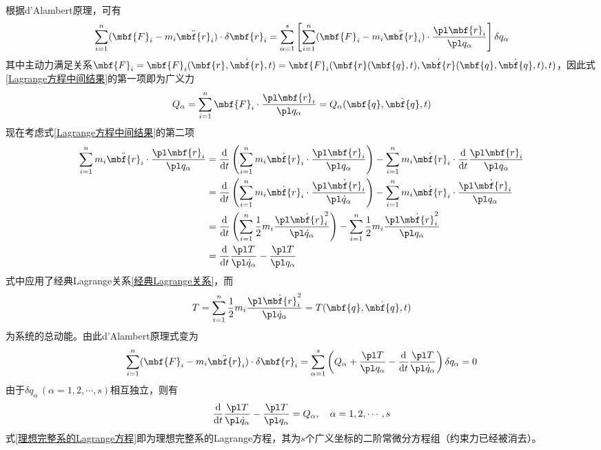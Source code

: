 根据d'Alambert原理，可有
\begin{equation}
	\sum_{i=1}^n (\mbf{F}_i - m_i \ddot{\mbf{r}}_i) \cdot \delta \mbf{r}_i = \sum_{\alpha=1}^s \left[\sum_{i=1}^n (\mbf{F}_i - m_i \ddot{\mbf{r}}_i) \cdot \frac{\pl \mbf{r}_i}{\pl q_\alpha}\right] \delta q_\alpha
	\label{Lagrange方程中间结果}
\end{equation}
其中主动力满足关系$\mbf{F}_i = \mbf{F}_i(\mbf{r},\dot{\mbf{r}},t) = \mbf{F}_i(\mbf{r}(\mbf{q},t),\dot{\mbf{r}}(\mbf{q},\dot{\mbf{q}},t),t)$，因此式\eqref{Lagrange方程中间结果}的第一项即为广义力
\begin{equation*}
	Q_\alpha = \sum_{i=1}^n \mbf{F}_i \cdot \frac{\pl \mbf{r}_i}{\pl q_\alpha} = Q_\alpha(\mbf{q},\dot{\mbf{q}},t)
\end{equation*}
现在考虑式\eqref{Lagrange方程中间结果}的第二项
\begin{align*}
	\sum_{i=1}^n m_i \ddot{\mbf{r}}_i \cdot \frac{\pl \mbf{r}_i}{\pl q_\alpha} & = \frac{\mathrm{d}}{\mathrm{d} t} \left(\sum_{i=1}^n m_i\dot{\mbf{r}}_i \cdot \frac{\pl \mbf{r}_i}{\pl q_\alpha}\right) - \sum_{i=1}^n m_i \dot{\mbf{r}}_i \cdot \frac{\mathrm{d}}{\mathrm{d} t} \frac{\pl \mbf{r}_i}{\pl q_\alpha} \\
	& = \frac{\mathrm{d}}{\mathrm{d} t} \left(\sum_{i=1}^n m_i\dot{\mbf{r}}_i \cdot \frac{\pl \dot{\mbf{r}}_i}{\pl \dot{q}_\alpha}\right) - \sum_{i=1}^n m_i \dot{\mbf{r}}_i \cdot \frac{\pl \dot{\mbf{r}}_i}{\pl q_\alpha} \\
	& = \frac{\mathrm{d}}{\mathrm{d} t} \left(\sum_{i=1}^n \frac12 m_i\frac{\pl \dot{\mbf{r}}_i^2}{\pl \dot{q}_\alpha}\right) - \sum_{i=1}^n \frac12 m_i \frac{\pl \dot{\mbf{r}}_i^2}{\pl q_\alpha} \\
	& = \frac{\mathrm{d}}{\mathrm{d} t} \frac{\pl T}{\pl \dot{q}_\alpha} - \frac{\pl T}{\pl q_\alpha}
\end{align*}
式中应用了经典Lagrange关系\eqref{经典Lagrange关系}，而
\begin{equation*}
	T = \sum_{i=1}^n \frac12 m_i\frac{\pl \dot{\mbf{r}}_i^2}{\pl \dot{q}_\alpha} = T(\mbf{q},\dot{\mbf{q}},t)
\end{equation*}
为系统的总动能。由此d'Alambert原理式变为
\begin{equation*}
	\sum_{i=1}^n (\mbf{F}_i - m_i \ddot{\mbf{r}}_i) \cdot \delta \mbf{r}_i = \sum_{\alpha=1}^s \left(Q_\alpha+\frac{\pl T}{\pl q_\alpha} - \frac{\mathrm{d}}{\mathrm{d} t} \frac{\pl T}{\pl \dot{q}_\alpha}\right) \delta q_\alpha = 0
\end{equation*}
由于$\delta q_\alpha\,(\alpha = 1,2,\cdots,s)$相互独立，则有
\begin{equation}
	\frac{\mathrm{d}}{\mathrm{d} t} \frac{\pl T}{\pl \dot{q}_\alpha} - \frac{\pl T}{\pl q_\alpha} = Q_\alpha,\quad \alpha = 1,2,\cdots,s
	\label{理想完整系的Lagrange方程}
\end{equation}
式\eqref{理想完整系的Lagrange方程}即为理想完整系的Lagrange方程，其为$s$个广义坐标的二阶常微分方程组（约束力已经被消去）。


